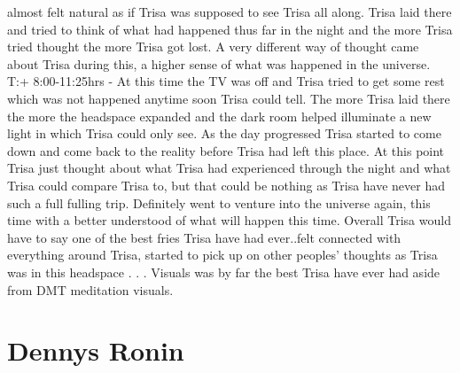 \documentclass[12pt]{book}
\begin{document}
almost felt natural as if Trisa was supposed to see Trisa all along. Trisa laid there and tried to think of what had happened thus far in the night and the more Trisa tried thought the more Trisa got lost. A very different way of thought came about Trisa during this, a higher sense of what was happened in the universe. T:+ 8:00-11:25hrs - At this time the TV was off and Trisa tried to get some rest which was not happened anytime soon Trisa could tell. The more Trisa laid there the more the headspace expanded and the dark room helped illuminate a new light in which Trisa could only see. As the day progressed Trisa started to come down and come back to the reality before Trisa had left this place. At this point Trisa just thought about what Trisa had experienced through the night and what Trisa could compare Trisa to, but that could be nothing as Trisa have never had such a full fulling trip. Definitely went to venture into the universe again, this time with a better understood of what will happen this time. Overall Trisa would have to say one of the best fries Trisa have had ever..felt connected with everything around Trisa, started to pick up on other peoples' thoughts as Trisa was in this headspace . . .  Visuals was by far the best Trisa have ever had aside from DMT meditation visuals.



\chapter{Dennys Ronin}
\end{document}
